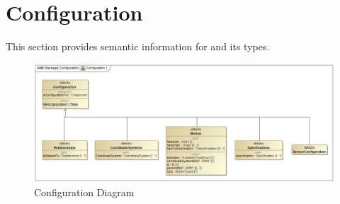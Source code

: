 

\section{Configuration}
\label{sec:Configuration}

This section provides semantic information for  and its types.

\begin{figure}[ht]
  \centering
    \includegraphics[width=1.0\textwidth]{figures/Configuration.png}
  \caption{Configuration Diagram}
  \label{fig:Configuration}
\end{figure}

\FloatBarrier












